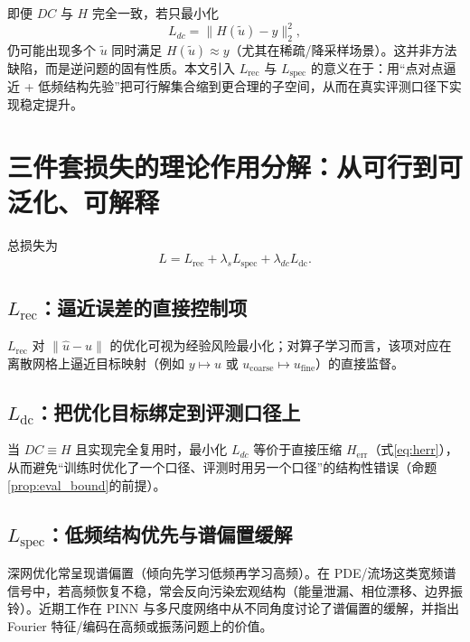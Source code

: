 即便 $DC$ 与 $H$ 完全一致，若只最小化
\begin{equation}
L_{dc}=\|H(\tilde u)-y\|_2^2,
\label{eq:Ldc_only}
\end{equation}
仍可能出现多个 $\tilde u$ 同时满足 $H(\tilde u)\approx y$（尤其在稀疏/降采样场景）。这并非方法缺陷，而是逆问题的固有性质。本文引入 $L_{\text{rec}}$ 与 $L_{\text{spec}}$ 的意义在于：用“点对点逼近 + 低频结构先验”把可行解集合缩到更合理的子空间，从而在真实评测口径下实现稳定提升。

\section{三件套损失的理论作用分解：从可行到可泛化、可解释}\label{sec:triple_loss}

总损失为
\begin{equation}
L = L_{\text{rec}} + \lambda_s L_{\text{spec}} + \lambda_{dc} L_{\text{dc}}.
\label{eq:total_loss_theory}
\end{equation}

\subsection{\texorpdfstring{$L_{\text{rec}}$}{Lrec}：逼近误差的直接控制项}\label{sec:Lrec}
$L_{\text{rec}}$ 对 $\|\hat u-u\|$ 的优化可视为经验风险最小化；对算子学习而言，该项对应在离散网格上逼近目标映射（例如 $y\mapsto u$ 或 $u_{\text{coarse}}\mapsto u_{\text{fine}}$）的直接监督。

\subsection{\texorpdfstring{$L_{\text{dc}}$}{Ldc}：把优化目标绑定到评测口径上}\label{sec:Ldc}
当 $DC\equiv H$ 且实现完全复用时，最小化 $L_{dc}$ 等价于直接压缩 $H_{\text{err}}$（式\eqref{eq:herr}），从而避免“训练时优化了一个口径、评测时用另一个口径”的结构性错误（命题\ref{prop:eval_bound}的前提）。

\subsection{\texorpdfstring{$L_{\text{spec}}$}{Lspec}：低频结构优先与谱偏置缓解}\label{sec:Lspec}
深网优化常呈现谱偏置（倾向先学习低频再学习高频）。在 PDE/流场这类宽频谱信号中，若高频恢复不稳，常会反向污染宏观结构（能量泄漏、相位漂移、边界振铃）。近期工作在 PINN 与多尺度网络中从不同角度讨论了谱偏置的缓解，并指出 Fourier 特征/编码在高频或振荡问题上的价值\cite{liu2025diminishing_spectral_bias,wang2025spectralbias_multiscale}。

